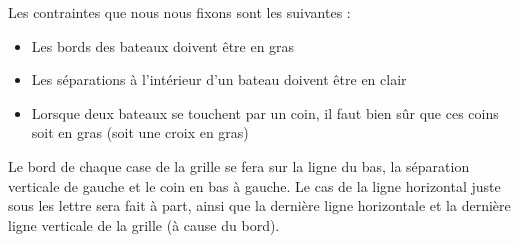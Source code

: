 Les contraintes que nous nous fixons sont les suivantes :
\begin{itemize}
\item Les bords des bateaux doivent être en gras
\item Les séparations à l'intérieur d'un bateau doivent être en clair
\item Lorsque deux bateaux se touchent par un coin, il faut bien sûr que ces coins soit en gras (soit une croix en gras)
\end{itemize}


Le bord de chaque case de la grille se fera sur la ligne du bas, la séparation verticale de gauche et le coin en bas à gauche. Le cas de la ligne horizontal juste sous les lettre sera fait à part, ainsi que la dernière ligne horizontale et la dernière ligne verticale de la grille (à cause du bord).


